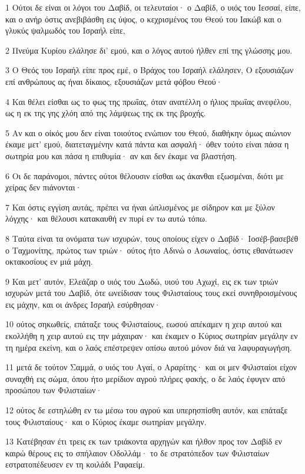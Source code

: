\par 1 Ούτοι δε είναι οι λόγοι του Δαβίδ, οι τελευταίοι· ο Δαβίδ, ο υιός του Ιεσσαί, είπε, και ο ανήρ όστις ανεβιβάσθη εις ύψος, ο κεχρισμένος του Θεού του Ιακώβ και ο γλυκύς ψαλμωδός του Ισραήλ είπε,
\par 2 Πνεύμα Κυρίου ελάλησε δι' εμού, και ο λόγος αυτού ήλθεν επί της γλώσσης μου.
\par 3 Ο Θεός του Ισραήλ είπε προς εμέ, ο Βράχος του Ισραήλ ελάλησεν, Ο εξουσιάζων επί ανθρώπους ας ήναι δίκαιος, εξουσιάζων μετά φόβου Θεού·
\par 4 Και θέλει είσθαι ως το φως της πρωΐας, όταν ανατέλλη ο ήλιος πρωΐας ανεφέλου, ως η εκ της γης χλόη από της λάμψεως της εκ της βροχής.
\par 5 Αν και ο οίκός μου δεν είναι τοιούτος ενώπιον του Θεού, διαθήκην όμως αιώνιον έκαμε μετ' εμού, διατεταγμένην κατά πάντα και ασφαλή· όθεν τούτο είναι πάσα η σωτηρία μου και πάσα η επιθυμία· αν και δεν έκαμε να βλαστήση.
\par 6 Οι δε παράνομοι, πάντες ούτοι θέλουσιν είσθαι ως άκανθαι εξωσμέναι, διότι με χείρας δεν πιάνονται·
\par 7 Και όστις εγγίση αυτάς, πρέπει να ήναι ώπλισμένος με σίδηρον και με ξύλον λόγχης· και θέλουσι κατακαυθή εν πυρί εν τω αυτώ τόπω.
\par 8 Ταύτα είναι τα ονόματα των ισχυρών, τους οποίους είχεν ο Δαβίδ· Ιοσέβ-βασεβέθ ο Ταχμονίτης, πρώτος των τριών· ούτος ήτο Αδινώ ο Ασωναίος, όστις εθανάτωσεν οκτακοσίους εν μιά μάχη.
\par 9 Και μετ' αυτόν, Ελεάζαρ ο υιός του Δωδώ, υιού του Αχωχί, εις εκ των τριών ισχυρών μετά του Δαβίδ, ότε ωνείδισαν τους Φιλισταίους τους εκεί συνηθροισμένους εις μάχην, και οι άνδρες Ισραήλ εσύρθησαν·
\par 10 ούτος σηκωθείς, επάταξε τους Φιλισταίους, εωσού απέκαμεν η χειρ αυτού και εκολλήθη η χειρ αυτού εις την μάχαιραν· και έκαμεν ο Κύριος σωτηρίαν μεγάλην εν τη ημέρα εκείνη, και ο λαός επέστρεψεν οπίσω αυτού μόνον διά να λαφυραγωγήση.
\par 11 μετά δε τούτον Σαμμά, ο υιός του Αγαί, ο Αραρίτης· και οι μεν Φιλισταίοι είχον συναχθή εις σώμα, όπου ήτο μερίδιον αγρού πλήρες φακής, ο δε λαός έφυγεν από προσώπου των Φιλισταίων·
\par 12 ούτος δε εστηλώθη εν τω μέσω του αγρού και υπερησπίσθη αυτόν, και επάταξε τους Φιλισταίους· και ο Κύριος έκαμε σωτηρίαν μεγάλην.
\par 13 Κατέβησαν έτι τρεις εκ των τριάκοντα αρχηγών και ήλθον προς τον Δαβίδ εν καιρώ θέρους εις το σπήλαιον Οδολλάμ· το δε στρατόπεδον των Φιλισταίων εστρατοπέδευσεν εν τη κοιλάδι Ραφαείμ.
